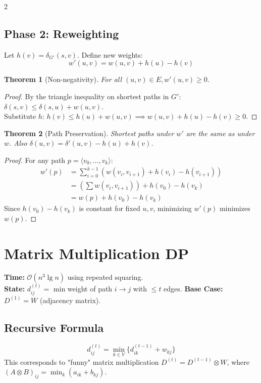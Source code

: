 \documentclass[10pt, a4paper]{article}
\newcommand{\BigO}[1]{\mathcal{O}(#1)}
\newcommand{\dist}{\delta}
\theoremstyle{compact}
\newtheorem*{theorem}{Theorem}
\begin{document}
\begin{multicols*}{2}
\subsection{Phase 2: Reweighting}
Let $h(v) = \dist_{G'}(s, v)$. Define new weights:
\[ w'(u,v) = w(u,v) + h(u) - h(v) \]

\begin{theorem}[Non-negativity]
For all $(u,v) \in E, w'(u,v) \ge 0$.
\end{theorem}
\begin{proof}
By the triangle inequality on shortest paths in $G'$: $\dist(s,v) \le \dist(s,u) + w(u,v)$. \\
Substitute $h$: $h(v) \le h(u) + w(u,v) \implies w(u,v) + h(u) - h(v) \ge 0$.
\end{proof}

\begin{theorem}[Path Preservation]
Shortest paths under $w'$ are the same as under $w$. Also $\dist(u,v) = \dist'(u,v) - h(u) + h(v)$.
\end{theorem}
\begin{proof}
For any path $p = \langle v_0, \dots, v_k \rangle$:
\begin{align*}
w'(p) &= \sum_{i=0}^{k-1} (w(v_i, v_{i+1}) + h(v_i) - h(v_{i+1})) \\
&= \left(\sum w(v_i, v_{i+1})\right) + h(v_0) - h(v_k) \\
&= w(p) + h(v_0) - h(v_k)
\end{align*}
Since $h(v_0) - h(v_k)$ is constant for fixed $u,v$, minimizing $w'(p)$ minimizes $w(p)$.
\end{proof}

\section{Matrix Multiplication DP}
\textbf{Time:} $\BigO{n^3 \lg n}$ using repeated squaring. \\
\textbf{State:} $d_{ij}^{(t)} =$ min weight of path $i \to j$ with $\le t$ edges.
\textbf{Base Case:} $D^{(1)} = W$ (adjacency matrix).

\subsection{Recursive Formula}
\[ d_{ij}^{(t)} = \min_{k \in V} \{ d_{ik}^{(t-1)} + w_{kj} \} \]
This corresponds to "funny" matrix multiplication $D^{(t)} = D^{(t-1)} \otimes W$, where $(A \otimes B)_{ij} = \min_k (a_{ik} + b_{kj})$.


\end{multicols*}
\end{document}

